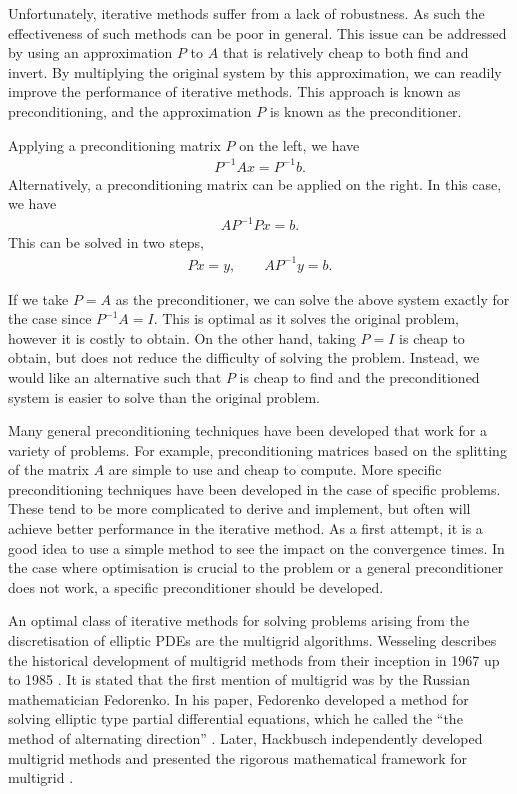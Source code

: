 Unfortunately, iterative methods suffer from a lack of robustness.
As such the effectiveness of such methods can be poor in general.
This issue can be addressed by using an approximation $P$ to $A$ that is relatively cheap to both find and invert.
By multiplying the original system by this approximation, we can readily improve the performance of iterative methods.
This approach is known as preconditioning, and the approximation $P$ is known as the preconditioner.

Applying a preconditioning matrix $P$ on the left, we have
\begin{align}
	P^{-1} A x = P^{-1} b. \label{eqn:precond_left}
\end{align}
Alternatively, a preconditioning matrix can be applied on the right.
In this case, we have
\begin{align}
	A P^{-1} P x = b. \label{eqn:precond_right}
\end{align}
This can be solved in two steps, 
\begin{align}
	P x = y, \qquad A P^{-1} y = b.
\end{align}

If we take $P=A$ as the preconditioner, we can solve the above system exactly for the case since $P^{-1}A=I$. 
This is optimal as it solves the original problem, however it is costly to obtain.
On the other hand, taking $P=I$ is cheap to obtain, but does not reduce the difficulty of solving the problem.
Instead, we would like an alternative such that $P$ is cheap to find and the preconditioned system is easier to solve than the original problem.

Many general preconditioning techniques have been developed that work for a variety of problems.
For example, preconditioning matrices based on the splitting of the matrix $A$ are simple to use and cheap to compute.
More specific preconditioning techniques have been developed in the case of specific problems.
These tend to be more complicated to derive and implement, but often will achieve better performance in the iterative method.
As a first attempt, it is a good idea to use a simple method to see the impact on the convergence times.
In the case where optimisation is crucial to the problem or a general preconditioner does not work, a specific preconditioner should be developed.


An optimal class of iterative methods for solving problems arising from the discretisation of elliptic PDEs are the multigrid algorithms.
Wesseling describes the historical development of multigrid methods from their inception in 1967 up to 1985 \cite{wesseling}.
It is stated that the first mention of multigrid was by the Russian mathematician Fedorenko.
In his paper, Fedorenko developed a method for solving elliptic type partial differential equations, which he called the ``the method of alternating direction'' \cite{fedorenko}.
Later, Hackbusch independently developed multigrid methods and presented the rigorous mathematical framework for multigrid \cite{hackbusch}.

